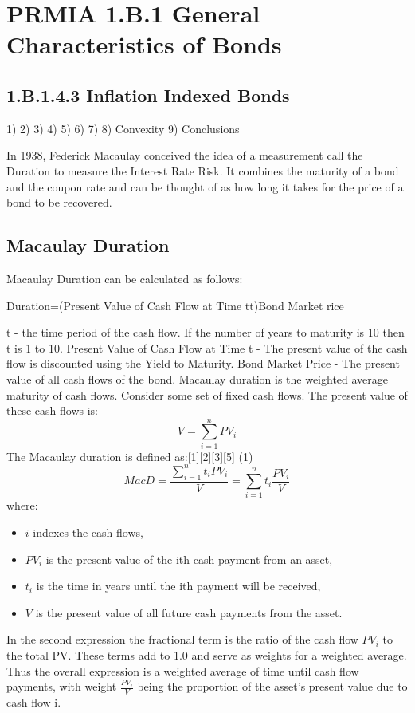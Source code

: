 \section{PRMIA 1.B.1 General Characteristics of Bonds} 

\subsection{1.B.1.4.3 Inflation Indexed Bonds}



1)
2)
3)
4)
5) 
6)
7) 
8) Convexity
9) Conclusions

In 1938, Federick Macaulay conceived the idea of a measurement call the Duration to measure the Interest Rate Risk. It combines the maturity of a bond and the coupon rate and can be thought of as how long it takes for the price of a bond to be recovered.
\subsection{Macaulay Duration}
Macaulay Duration can be calculated as follows:

Duration=(Present Value of Cash Flow at Time tt)Bond Market rice

t - the time period of the cash flow. If the number of years to maturity is 10 then t is 1 to 10.
Present Value of Cash Flow at Time t - The present value of the cash flow is discounted using the Yield to Maturity.
Bond Market Price - The present value of all cash flows of the bond.
Macaulay duration is the weighted average maturity of cash flows. Consider some set of fixed cash flows. The present value of these cash flows is:
\[V = \sum_{i=1}^{n}PV_i \]
The Macaulay duration is defined as:[1][2][3][5]
(1)     \[MacD = \frac{\sum_{i=1}^{n}{t_i PV_i}} {V} = \sum_{i=1}^{n}t_i \frac{{PV_i}} {V} \]
where:
\begin{itemize}
\item $i$ indexes the cash flows,
\item $PV_i$ is the present value of the ith cash payment from an asset,
\item $t_i$ is the time in years until the ith payment will be received,
\item $V$ is the present value of all future cash payments from the asset.
\end{itemize}
In the second expression the fractional term is the ratio of the cash flow $PV_i$ to the total PV. These terms add to 1.0 and serve as weights for a weighted average. Thus the overall expression is a weighted average of time until cash flow payments, with weight $\frac{PV_i}{V}$  being the proportion of the asset's present value due to cash flow i.
